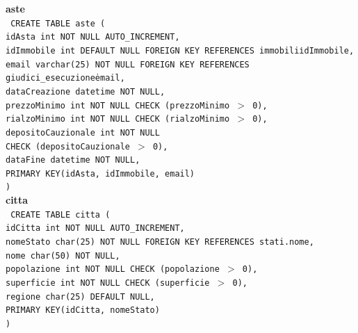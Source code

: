 \documentclass[a4paper,12pt]{report}
\begin{document}
                \noindent
                {\large \textbf{aste}} \\
                \texttt{
                    CREATE TABLE aste ( \\
                    \null\quad\quad idAsta          int         NOT NULL AUTO\_INCREMENT, \\
                    \null\quad\quad idImmobile int DEFAULT NULL FOREIGN KEY REFERENCES immobili\.idImmobile, \\
                    \null\quad\quad email varchar(25) NOT NULL FOREIGN KEY REFERENCES giudici\_esecuzione\.email, \\
                    \null\quad\quad dataCreazione       datetime    NOT NULL, \\
                    \null\quad\quad prezzoMinimo        int         NOT NULL CHECK (prezzoMinimo $>$ 0), \\
                    \null\quad\quad rialzoMinimo        int         NOT NULL CHECK (rialzoMinimo $>$ 0), \\
                    \null\quad\quad depositoCauzionale  int         NOT NULL \\
                            \null\qquad\qquad CHECK (depositoCauzionale $>$ 0), \\
                    \null\quad\quad dataFine            datetime    NOT NULL, \\
                    \null\quad\quad PRIMARY KEY(idAsta, idImmobile, email) \\
                    )
                } \\

                \noindent
                {\large \textbf{citta}} \\
                \texttt{
                    CREATE TABLE citta ( \\
                    \null\quad\quad idCitta         int         NOT NULL AUTO\_INCREMENT, \\
                    \null\quad\quad nomeStato char(25) NOT NULL FOREIGN KEY REFERENCES stati.nome, \\
                    \null\quad\quad nome            char(50)    NOT NULL, \\
                    \null\quad\quad popolazione     int         NOT NULL CHECK (popolazione $>$ 0), \\
                    \null\quad\quad superficie      int         NOT NULL CHECK (superficie $>$ 0), \\
                    \null\quad\quad regione         char(25) DEFAULT NULL, \\
                    \null\quad\quad PRIMARY KEY(idCitta, nomeStato) \\
                    )
                } \\
\end{document}
